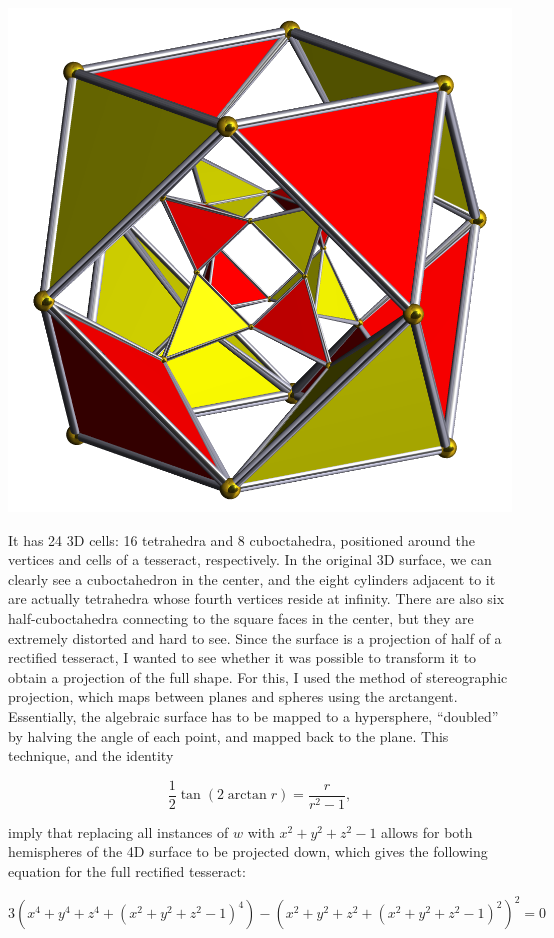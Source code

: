 \documentclass{article}
\begin{document}
\begin{center}
  \includegraphics[width=0.25\linewidth]{rit.png}
\end{center}
It has 24 3D cells: 16 tetrahedra and 8 cuboctahedra,
positioned around the vertices and cells of a tesseract, respectively.
In the original 3D surface, we can clearly see a cuboctahedron in the center,
and the eight cylinders adjacent to it are actually tetrahedra
whose fourth vertices reside at infinity.
There are also six half-cuboctahedra connecting to the square faces in the center,
but they are extremely distorted and hard to see.
Since the surface is a projection of half of a rectified tesseract,
I wanted to see whether it was possible to transform it
to obtain a projection of the full shape.
For this, I used the method of stereographic projection,
which maps between planes and spheres using the arctangent.
Essentially, the algebraic surface has to be mapped to a hypersphere,
``doubled'' by halving the angle of each point,
and mapped back to the plane.
This technique, and the identity

\[\frac{1}{2}\tan(2\arctan r)=\frac{r}{r^2-1},\]

imply that replacing all instances of $w$ with $x^2+y^2+z^2-1$
allows for both hemispheres of the 4D surface to be projected down,
which gives the following equation for the full rectified tesseract:

\[3(x^4+y^4+z^4+(x^2+y^2+z^2-1)^4)-(x^2+y^2+z^2+(x^2+y^2+z^2-1)^2)^2 = 0\]
\end{document}
